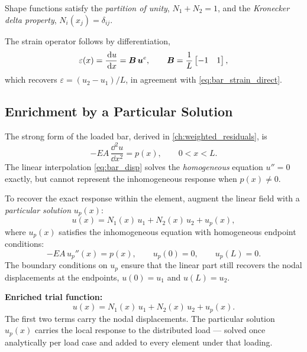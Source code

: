 \begin{remark}
Shape functions satisfy the \emph{partition of unity}, $N_1 + N_2 = 1$, and the
\emph{Kronecker delta property}, $N_i(x_j) = \delta_{ij}$.
\end{remark}

The strain operator follows by differentiation,
\begin{equation}
    \varepsilon(x) = \frac{\,\mathrm{d} u}{\,\mathrm{d} x} = \bm{B}\,\bm{u}^e,
    \qquad
    \bm{B} = \frac{1}{L}\begin{bmatrix} -1 & 1 \end{bmatrix} ,
    \label{eq:bar_strain}
\end{equation}
which recovers $\varepsilon = (u_2-u_1)/L$, in agreement with
\cref{eq:bar_strain_direct}.

\subsection{Enrichment by a Particular Solution}

The strong form of the loaded bar, derived in \cref{ch:weighted_residuals}, is
\begin{equation}
    -EA\,\frac{\dd^2 u}{\dd x^2} = p(x), \qquad 0 < x < L .
    \label{eq:bar_de}
\end{equation}
The linear interpolation \cref{eq:bar_disp} solves the \emph{homogeneous}
equation $u'' = 0$ exactly, but cannot represent the inhomogeneous response
when $p(x) \neq 0$.

To recover the exact response within the element, augment the linear field
with a \emph{particular solution} $u_p(x)$:
\begin{equation}
    u(x) = N_1(x)\,u_1 + N_2(x)\,u_2 + u_p(x) ,
    \label{eq:bar_disp_enriched}
\end{equation}
where $u_p(x)$ satisfies the inhomogeneous equation with homogeneous endpoint
conditions:
\begin{equation}
    -EA\,u_p''(x) = p(x), \qquad u_p(0) = 0, \qquad u_p(L) = 0 .
    \label{eq:up_bvp}
\end{equation}
The boundary conditions on $u_p$ ensure that the linear part still recovers the
nodal displacements at the endpoints, $u(0)=u_1$ and $u(L)=u_2$.

\begin{importantbox}
\textbf{Enriched trial function:}
\begin{equation*}
    u(x) = N_1(x)\,u_1 + N_2(x)\,u_2 + u_p(x) .
\end{equation*}
The first two terms carry the nodal displacements. The particular solution
$u_p(x)$ carries the local response to the distributed load — solved once
analytically per load case and added to every element under that loading.
\end{importantbox}

